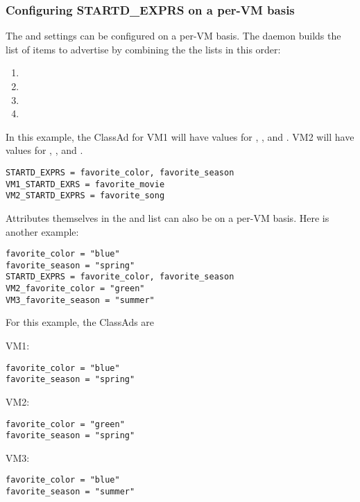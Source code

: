 \subsubsection{\label{sec:SMP-exprs}
Configuring STARTD\_EXPRS on a per-VM basis}

The  and  settings can be
configured on a per-VM basis.
The  daemon builds the list of items to
advertise by combining the the lists in this order:
\begin{enumerate}
\item{}
\item{}
\item{}
\item{} 
\end{enumerate}

In this example, the  ClassAd for
VM1 will have values for 
, ,
and .
VM2 will have values for 
, , and .

\begin{verbatim}
STARTD_EXPRS = favorite_color, favorite_season
VM1_STARTD_EXRS = favorite_movie
VM2_STARTD_EXPRS = favorite_song
\end{verbatim}

Attributes themselves in the 
and  list 
can also be on a per-VM basis.  
Here is another example:

\begin{verbatim}
favorite_color = "blue"
favorite_season = "spring"
STARTD_EXPRS = favorite_color, favorite_season
VM2_favorite_color = "green"
VM3_favorite_season = "summer"
\end{verbatim}

For this example, the  ClassAds are
\begin{description}
\item{VM1}:
\begin{verbatim}
favorite_color = "blue"
favorite_season = "spring"
\end{verbatim}
\item{VM2}:
\begin{verbatim}
favorite_color = "green"
favorite_season = "spring"
\end{verbatim}
\item{VM3}:
\begin{verbatim}
favorite_color = "blue"
favorite_season = "summer"
\end{verbatim}
\end{description}

